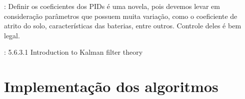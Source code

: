 \cite{samani2007comprehensive}: Definir os coeficientes dos PIDs é uma novela, pois devemos levar em consideração parâmetros que possuem muita variação, como o coeficiente de atrito do solo, características das baterias, entre outros. Controle deles é bem legal.





\cite{siegwart2011introduction}: 5.6.3.1 Introduction to Kalman filter theory



\section{Implementação dos algoritmos}
\label{sec:software}

